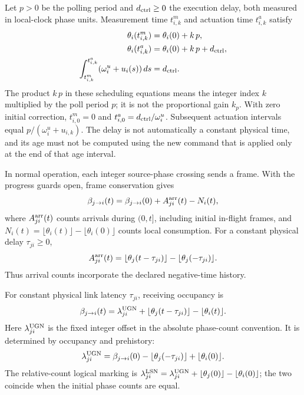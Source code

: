 Let $p>0$ be the polling period and $d_{\rm ctrl}\ge0$ the execution delay,
both measured in local-clock phase units. Measurement time $t^m_{i,k}$
and actuation time $t^a_{i,k}$ satisfy
\begin{align}
 \theta_i(t^m_{i,k})&=\theta_i(0)+k\,p,\nonumber\\
 \theta_i(t^a_{i,k})&=\theta_i(0)+k\,p+d_{\rm ctrl},\nonumber\\
 \int_{t^m_{i,k}}^{t^a_{i,k}}(\omega_i^u+u_i(s))\,ds&=d_{\rm ctrl}.
 \label{detail:eq:fpi_local_schedule}
\end{align}
The product $k\,p$ in these scheduling equations means the integer index
$k$ multiplied by the poll period $p$; it is not the proportional gain
$k_p$. With zero initial correction, $t^m_{i,0}=0$ and
$t^a_{i,0}=d_{\rm ctrl}/\omega_i^u$. Subsequent actuation intervals equal
$p/(\omega_i^u+u_{i,k})$. The delay is not automatically a constant
physical time, and its age must not be computed using the new command
that is applied only at the end of that age interval.

In normal operation, each integer source-phase crossing sends a frame.
With the progress guards open, frame conservation gives
\begin{equation}
 \beta_{j\to i}(t)=\beta_{j\to i}(0)+A^{\rm arr}_{ji}(t)-N_i(t),
 \label{detail:eq:fpi_count_balance}
\end{equation}
where $A^{\rm arr}_{ji}(t)$ counts arrivals during $(0,t]$, including
initial in-flight frames, and
$N_i(t)=\lfloor\theta_i(t)\rfloor-\lfloor\theta_i(0)\rfloor$ counts
local consumption. For a constant physical delay $\tau_{ji}\ge0$,
\begin{equation}
 A^{\rm arr}_{ji}(t)=\lfloor\theta_j(t-\tau_{ji})\rfloor
                  -\lfloor\theta_j(-\tau_{ji})\rfloor.
 \label{detail:eq:fpi_fixed_delay_arrivals}
\end{equation}
Thus arrival counts incorporate the declared negative-time history.

For constant physical link latency $\tau_{ji}$, receiving occupancy is
\begin{equation}
 \beta_{j\to i}(t)=\lambda^{\rm UGN}_{ji}
 +\lfloor\theta_j(t-\tau_{ji})\rfloor-\lfloor\theta_i(t)\rfloor.
 \label{detail:eq:fpd_continuous_fifo}
\end{equation}
Here $\lambda^{\rm UGN}_{ji}$ is the fixed integer offset in the absolute
phase-count convention. It is determined by occupancy and prehistory:
\begin{equation}
 \lambda^{\rm UGN}_{ji}=\beta_{j\to i}(0)
 -\lfloor\theta_j(-\tau_{ji})\rfloor+\lfloor\theta_i(0)\rfloor.
 \label{detail:eq:fpd_ugn_init}
\end{equation}
The relative-count logical marking is
$\lambda^{\rm LSN}_{ji}=\lambda^{\rm UGN}_{ji}
+\lfloor\theta_j(0)\rfloor-\lfloor\theta_i(0)\rfloor$;
the two coincide when the initial phase counts are equal.

